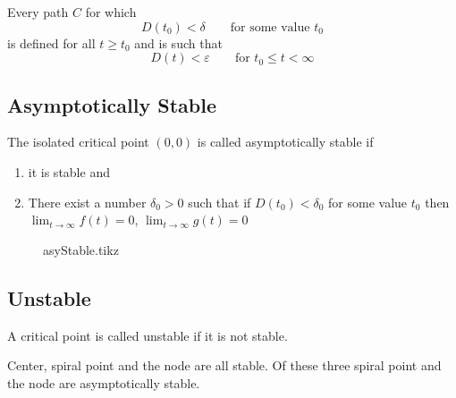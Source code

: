 \documentclass[../main-sheet.tex]{subfiles}
\begin{document}
Every path \(C\) for which
\begin{equation}
    D(t_0)<\delta \qquad\text{for some value }t_0\label{eq:s3}
\end{equation}
is defined for all \(t\geq t_0\) and is such that
\begin{equation}
    D(t)<\varepsilon \qquad \text{for } t_0\leq t<\infty \label{eq:s4}
\end{equation}
\subsection{Asymptotically Stable}
The isolated critical point \((0,0)\) is called asymptotically stable if 
\begin{enumerate}[label=(\roman*)]
    \item it is stable and
    \item There exist a number \(\delta_0 >0\) such that if \(D(t_0)<\delta_0\) for some value \(t_0\) then \(\displaystyle \lim_{t\to\infty}f(t)=0\), \(\displaystyle \lim_{t\to\infty}g(t)=0\)
\end{enumerate}
\begin{figure}[H]
    \centering
    {asyStable.tikz}
\end{figure}
\subsection{Unstable}
A critical point is called unstable if it is not stable.

Center, spiral point and the node are all stable. Of these three spiral point and the node are asymptotically stable.
\end{document}
